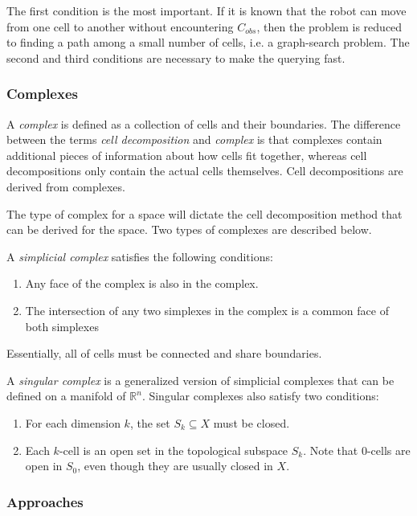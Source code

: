 \documentclass[10pt,conference]{ieeeconf}
\begin{document}
The first condition is the most important. If it is known that the robot can move from one cell to another without encountering $C_{obs}$, then the problem is reduced to finding a path among a small number of cells, i.e. a graph-search problem. The second and third conditions are necessary to make the querying fast.


\subsubsection{Complexes}

A \emph{complex} is defined as a collection of cells and their boundaries. The difference between the terms \emph{cell decomposition} and \emph{complex} is that complexes contain additional pieces of information about how cells fit together, whereas cell decompositions only contain the actual cells themselves. Cell decompositions are derived from complexes.

The type of complex for a space will dictate the cell decomposition method that can be derived for the space. Two types of complexes are described below.

A \emph{simplicial complex} satisfies the following conditions:

\begin{enumerate}
\item Any face of the complex is also in the complex.
\item The intersection of any two simplexes in the complex is a common face of both simplexes
\end{enumerate}

Essentially, all of cells must be connected and share boundaries. 

A \emph{singular complex} is a generalized version of simplicial complexes that can be defined on a manifold of $\mathbb{R}^n$. Singular complexes also satisfy two conditions:

\begin{enumerate}
\item For each dimension $k$, the set $S_k \subseteq X$ must be closed. 
\item Each $k$-cell is an open set in the topological subspace $S_k$. Note that 0-cells are open in $S_0$, even though they are usually closed in $X$.
\end{enumerate} 

\subsubsection{Approaches}
\end{document}
